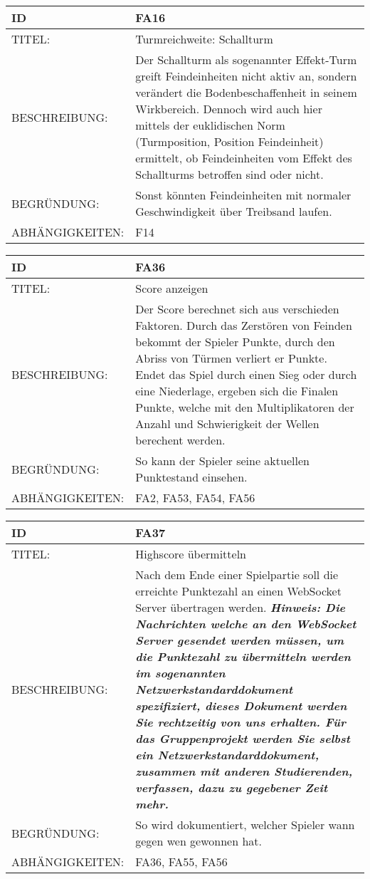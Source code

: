 \documentclass{uulm-assignment}
\begin{document}
\begin{tabularx}{16cm}{l|X}
	\textbf{ID} & \textbf{FA16} \\
	\hline
	TITEL: & Turmreichweite: Schallturm \\
	\hline
	BESCHREIBUNG: & Der Schallturm als sogenannter Effekt-Turm greift Feindeinheiten nicht aktiv an, sondern verändert die Bodenbeschaffenheit in seinem Wirkbereich.
	Dennoch wird auch hier mittels der euklidischen Norm (Turmposition, Position Feindeinheit) ermittelt, ob Feindeinheiten vom Effekt des Schallturms betroffen sind oder nicht.\\
	\hline
	BEGRÜNDUNG: & Sonst könnten Feindeinheiten mit normaler Geschwindigkeit über Treibsand laufen.\\
	\hline
	ABHÄNGIGKEITEN: & F14\\
\end{tabularx}

\begin{tabularx}{16cm}{l|X}
\textbf{ID} & \textbf{FA36} \\
\hline
TITEL: & Score anzeigen \\
\hline
BESCHREIBUNG: & Der Score berechnet sich aus verschieden Faktoren. Durch das Zerstören von Feinden bekommt der Spieler Punkte, durch den Abriss von Türmen verliert er Punkte. Endet das Spiel durch einen Sieg oder durch eine Niederlage, ergeben sich die Finalen Punkte, welche mit den Multiplikatoren der Anzahl und Schwierigkeit der Wellen berechent werden.
\\
\hline
BEGRÜNDUNG: & So kann der Spieler seine aktuellen Punktestand einsehen.\\
\hline
ABHÄNGIGKEITEN: & FA2, FA53, FA54, FA56 \\
\end{tabularx}

\begin{tabularx}{16cm}{l|X}
\textbf{ID} & \textbf{FA37} \\
\hline
TITEL: & Highscore übermitteln \\
\hline
BESCHREIBUNG: & Nach dem Ende einer Spielpartie soll die erreichte Punktezahl an einen WebSocket Server übertragen werden.
\textbf{\textit{Hinweis: Die Nachrichten welche an den WebSocket Server gesendet werden müssen, um
die Punktezahl zu übermitteln werden im sogenannten Netzwerkstandarddokument spezifiziert, dieses Dokument
werden Sie rechtzeitig von uns erhalten. Für das Gruppenprojekt werden Sie selbst ein 
Netzwerkstandarddokument, zusammen mit anderen Studierenden, verfassen, dazu zu gegebener Zeit mehr.}}
\\
\hline
BEGRÜNDUNG: & So wird dokumentiert, welcher Spieler wann gegen wen gewonnen hat. \\
\hline
ABHÄNGIGKEITEN: & FA36, FA55, FA56 \\
\end{tabularx}
\end{document}
